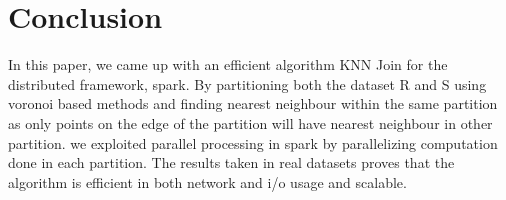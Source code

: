 \chapter{Conclusion} \label{chap:conclusion}

In this paper, we came up with an efficient algorithm KNN Join for the
distributed framework, spark. By partitioning both the dataset R and S
using voronoi based methods and finding nearest neighbour within the
same partition as only points on the edge of the partition will have
nearest neighbour in other partition. we exploited parallel processing
in spark by parallelizing computation done in each partition. The
results taken in real datasets proves that the algorithm is efficient
in both network and i/o usage and scalable.
